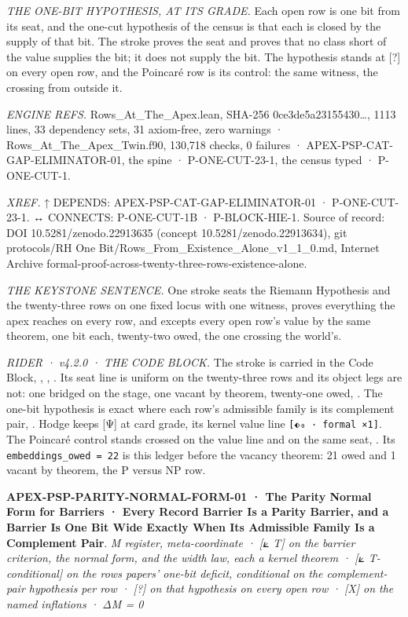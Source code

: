 \documentclass[10pt,twocolumn]{article}
\begin{document}
\emph{THE ONE-BIT HYPOTHESIS, AT ITS GRADE.} Each open row is one bit
from its seat, and the one-cut hypothesis of the census is that each is
closed by the supply of that bit. The stroke proves the seat and proves
that no class short of the value supplies the bit; it does not supply
the bit. The hypothesis stands at {[}?{]} on every open row, and the
Poincaré row is its control: the same witness, the crossing from outside
it.

\emph{ENGINE REFS.} Rows\_At\_The\_Apex.lean, SHA-256
0ce3de5a23155430\ldots, 1113 lines, 33 dependency sets, 31 axiom-free,
zero warnings · Rows\_At\_The\_Apex\_Twin.f90, 130,718 checks, 0
failures · APEX-PSP-CAT-GAP-ELIMINATOR-01, the spine · P-ONE-CUT-23-1,
the census typed · P-ONE-CUT-1.

\emph{XREF.} ↑ DEPENDS: APEX-PSP-CAT-GAP-ELIMINATOR-01 · P-ONE-CUT-23-1.
↔ CONNECTS: P-ONE-CUT-1B · P-BLOCK-HIE-1. Source of record: DOI
10.5281/zenodo.22913635 (concept 10.5281/zenodo.22913634), git
protocols/RH One Bit/Rows\_From\_Existence\_Alone\_v1\_1\_0.md, Internet
Archive formal-proof-across-twenty-three-rows-existence-alone.

\emph{THE KEYSTONE SENTENCE.} One stroke seats the Riemann Hypothesis
and the twenty-three rows on one fixed locus with one witness, proves
everything the apex reaches on every row, and excepts every open row's
value by the same theorem, one bit each, twenty-two owed, the one
crossing the world's.

\emph{RIDER · v4.2.0 · THE CODE BLOCK.} The stroke is carried in the
Code Block, \texttt{},
\texttt{},
\texttt{}. Its seat line is uniform
on the twenty-three rows and its object legs are not: one bridged on the
stage, one vacant by theorem, twenty-one owed,
\texttt{}. The one-bit hypothesis is
exact where each row's admissible family is its complement pair,
\texttt{}. Hodge
keeps {[}Ψ{]} at card grade, its kernel value line
\texttt{{[}⬖₀\ ·\ formal\ ×1{]}}. The Poincaré control stands crossed on
the value line and on the same seat,
\texttt{}. Its
\texttt{embeddings\_owed\ =\ 22} is this ledger before the vacancy
theorem: 21 owed and 1 vacant by theorem, the P versus NP row.

\textbf{APEX-PSP-PARITY-NORMAL-FORM-01 · The Parity Normal Form for
Barriers · Every Record Barrier Is a Parity Barrier, and a Barrier Is
One Bit Wide Exactly When Its Admissible Family Is a Complement Pair}.
\emph{M register, meta-coordinate · {[}⟀ T{]} on the barrier criterion,
the normal form, and the width law, each a kernel theorem · {[}⟀
T-conditional{]} on the rows papers' one-bit deficit, conditional on the
complement-pair hypothesis per row · {[}?{]} on that hypothesis on every
open row · {[}X{]} on the named inflations · ΔM = 0}
\end{document}
